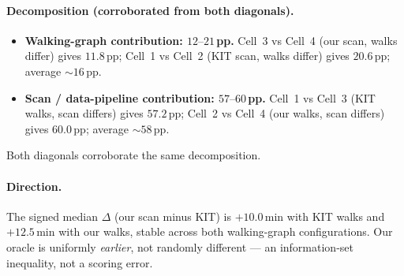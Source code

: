 \documentclass[letterpaper]{article}
\begin{document}
\paragraph{Decomposition (corroborated from both diagonals).}
\begin{itemize}
\item \textbf{Walking-graph contribution: $12\text{--}21$\,pp.}
Cell~3 vs Cell~4 (our scan, walks differ) gives $11.8$\,pp;
Cell~1 vs Cell~2 (KIT scan, walks differ) gives $20.6$\,pp; average
$\sim\!16$\,pp.
\item \textbf{Scan / data-pipeline contribution: $57\text{--}60$\,pp.}
Cell~1 vs Cell~3 (KIT walks, scan differs) gives $57.2$\,pp;
Cell~2 vs Cell~4 (our walks, scan differs) gives $60.0$\,pp; average
$\sim\!58$\,pp.
\end{itemize}
Both diagonals corroborate the same decomposition.

\paragraph{Direction.} The signed median $\Delta$ (our scan minus
KIT) is $+10.0$\,min with KIT walks and $+12.5$\,min with our walks,
stable across both walking-graph configurations. Our oracle is
uniformly \emph{earlier}, not randomly different --- an
information-set inequality, not a scoring error.
\end{document}
